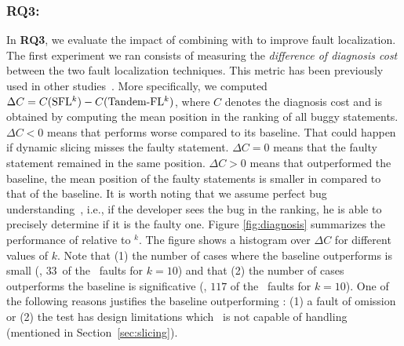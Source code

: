 \documentclass{article}
\begin{document}
\subsubsection{RQ3: \rqthree}

\newcommand{\numOutPerformed}{$33$}%
\newcommand{\numEquallyPerformed}{$110$}%


In \textbf{RQ3}, we evaluate the impact of combining \ds{} with \sfl{}
to improve fault localization. The first experiment we ran consists of
measuring the \emph{difference of diagnosis cost} between the two
fault localization techniques. This metric has been previously used in
other
studies~\cite{7390282,ang-perez-van-deursen-rui-2017,Pearson:2017:EIF:3097368.3097441,Perez:2018:LQR:3304889.3304927}.
More specifically, we computed $\Delta{}C = C(\textrm{SFL$^{k}$}) -
C(\textrm{Tandem-FL$^{k}$})$, where $C$ denotes the diagnosis cost and is
obtained by computing the mean position in the ranking of all buggy
statements. $\Delta C <0$ means that  performs worse
compared to its baseline. That could happen if dynamic slicing misses
the faulty statement. $\Delta C=0$ means that the faulty statement
remained in the same position. $\Delta C >0$ means that 
outperformed the baseline, \ie{} the mean position of the faulty
statements is smaller in  compared to that of the
baseline. It is worth noting that we assume perfect bug
understanding~\cite{Parnin:2011:ADT:2001420.2001445}, i.e., if the
developer sees the bug in the ranking, he is able to precisely
determine if it is the faulty one.  Figure \ref{fig:diagnosis}
summarizes the performance of  relative to
\sfl{}$^{k}$. The figure shows a histogram over $\Delta{}C$ for
different values of $k$. Note that (1) the number of cases where the
baseline outperforms  is small (\eg{}, \numOutPerformed\ of
the \numFaults\ faults for $k=10$) and that (2) the number of cases
 outperforms the baseline is significative (\eg{}, $117$ of
the \numFaults\ faults for $k=10$). One
of the following reasons justifies the baseline outperforming
: (1)
a fault of omission or (2) the test has design limitations which \ds~is
not capable of handling (mentioned in Section~\ref{sec:slicing}).

\end{document}
